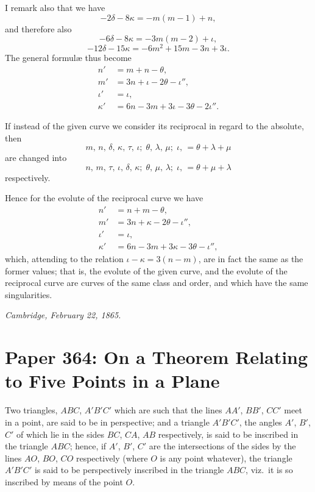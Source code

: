 \documentclass[11pt]{article}
\begin{document}
I remark also that we have
\[
-2\delta - 8\kappa = -m(m-1) + n,
\]
and therefore also
\[
-6\delta - 8\kappa = -3m(m-2) + \iota,
\]
\[
-12\delta - 15\kappa = -6m^{2} + 15m - 3n + 3\iota.
\]
The general formul\ae{} thus become
\begin{align*}
n' &= m + n - \theta,\\
m' &= 3n + \iota - 2\theta - \iota'',\\
\iota' &= \iota,\\
\kappa' &= 6n - 3m + 3\iota - 3\theta - 2\iota''.
\end{align*}

\newpage

\noindent If instead of the given curve we consider its reciprocal in regard to the absolute, then
\[
m,\, n,\, \delta,\, \kappa,\, \tau,\, \iota;\; \theta,\, \lambda,\, \mu;\; \iota,\, = \theta + \lambda + \mu
\]
are changed into
\[
n,\, m,\, \tau,\, \iota,\, \delta,\, \kappa;\; \theta,\, \mu,\, \lambda;\; \iota,\, = \theta + \mu + \lambda
\]
respectively.

Hence for the evolute of the reciprocal curve we have
\begin{align*}
n' &= n + m - \theta,\\
m' &= 3n + \kappa - 2\theta - \iota'',\\
\iota' &= \iota,\\
\kappa' &= 6n - 3m + 3\kappa - 3\theta - \iota'',
\end{align*}
which, attending to the relation $\iota - \kappa = 3(n - m)$, are in fact the same as the former values; that is, the evolute of the given curve, and the evolute of the reciprocal curve are curves of the same class and order, and which have the same singularities.

\medskip
\noindent\textit{Cambridge, February 22, 1865.}

\bigskip

\section*{Paper 364: On a Theorem Relating to Five Points in a Plane}

\medskip{}

\medskip
Two triangles, $ABC$, $A'B'C'$ which are such that the lines $AA'$, $BB'$, $CC'$ meet in a point, are said to be in perspective; and a triangle $A'B'C'$, the angles $A'$, $B'$, $C'$ of which lie in the sides $BC$, $CA$, $AB$ respectively, is said to be inscribed in the triangle $ABC$; hence, if $A'$, $B'$, $C'$ are the intersections of the sides by the lines $AO$, $BO$, $CO$ respectively (where $O$ is any point whatever), the triangle $A'B'C'$ is said to be perspectively inscribed in the triangle $ABC$, viz.\ it is so inscribed by means of the point $O$.
\end{document}
